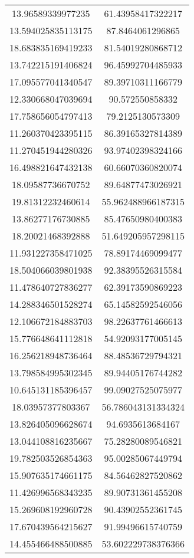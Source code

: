\begin{table}
\begin{tabular}{cc}
13.96589339977235 & 61.43958417322217 \\
13.594025835113175 & 87.8464061296865 \\
18.683835169419233 & 81.54019280868712 \\
13.742215191406824 & 96.45992704485933 \\
17.095577041340547 & 89.39710311166779 \\
12.330668047039694 & 90.572550858332 \\
17.758656054797413 & 79.2125130573309 \\
11.260370423395115 & 86.39165327814389 \\
11.270451944280326 & 93.97402398324166 \\
16.498821647432138 & 60.66070360820074 \\
18.09587736670752 & 89.64877473026921 \\
19.81312232460614 & 55.962488966187315 \\
13.86277176730885 & 85.47650980400383 \\
18.20021468392888 & 51.649205957298115 \\
11.931227358471025 & 78.89174469099477 \\
18.504066039801938 & 92.38395526315584 \\
11.478640727836277 & 62.39173590869223 \\
14.288346501528274 & 65.14582592546056 \\
12.106672184883703 & 98.22637761466613 \\
15.776648641112818 & 54.92093177005145 \\
16.256218948736464 & 88.48536729794321 \\
13.798584995302345 & 89.94405176744282 \\
10.645131185396457 & 99.09027525075977 \\
18.03957377803367 & 56.786043131334324 \\
13.826405096628674 & 94.6935613684167 \\
13.044108816235667 & 75.28280089546821 \\
19.782503526854363 & 95.00285067449794 \\
15.907635174661175 & 84.56462827520862 \\
11.426996568343235 & 89.90731361455208 \\
15.269608192960728 & 90.43902552361745 \\
17.670439564215627 & 91.99496615740759 \\
14.455466488500885 & 53.602229738376366 \\

\end{tabular}
\end{table}

